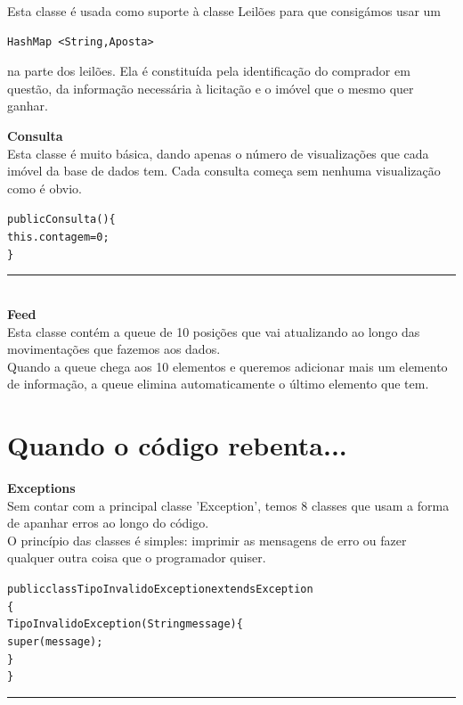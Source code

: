 \documentclass[12pt]{article}
\newenvironment{code}                    
{\textbf{
} \hspace{1cm} \hrulefill \\ 
\smallskip 
\begin{center}
\begin{minipage}{0.9\textwidth} 
\begin{alltt}\small}
{\end{alltt}
\end{minipage}
\end{center}
\hrule\smallskip
}
\begin{document}
Esta classe é usada como suporte à classe Leilões para que consigámos usar um 
\begin{verbatim}
HashMap <String,Aposta>
\end{verbatim}
na parte dos leilões.
Ela é constituída pela identificação do comprador em questão, da informação necessária à licitação e o imóvel que o mesmo quer ganhar.

\textbf{Consulta}
\newline
~\\

Esta classe é muito básica, dando apenas o número de visualizações que cada imóvel da base de dados tem.
Cada consulta começa sem nenhuma visualização como é obvio.
\begin{code}
public Consulta()\{
        this.contagem = 0;
    \}
\end{code}
~\\

\textbf{Feed}
\newline
~\\

Esta classe contém a queue de 10 posições que vai atualizando ao longo das movimentações que fazemos aos dados.
~\\

Quando a queue chega aos 10 elementos e queremos adicionar mais um elemento de informação, a queue elimina automaticamente o último elemento que tem.
\pagebreak

\section{Quando o código rebenta...}

\textbf{Exceptions}
\newline
~\\

Sem contar com a principal classe 'Exception', temos 8 classes que usam a forma de apanhar erros ao longo do código.
\\

O princípio das classes é simples: imprimir as mensagens de erro ou fazer qualquer outra coisa que o programador quiser.
\newline
\begin{code}
public class TipoInvalidoException extends Exception
\{
    TipoInvalidoException(String message)\{
       super(message);
    \}
\}
\end{code}
~\\
\end{document}
